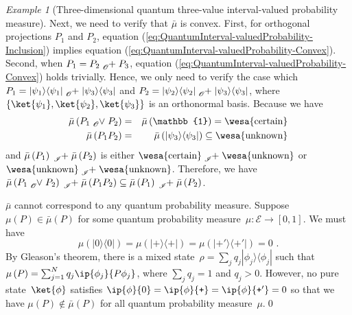 \documentclass{article}
\theoremstyle{remark}
\newtheorem{example}{Example}
\newcommand{\events}{\ensuremath{\mathcal{E}}}
\newcommand{\proj}[1]{|#1 \rangle\langle #1 |}
\newcommand{\ps}{\texttt{+}}
\newcommand{\necess}{{\mbox{\wesa{certain}}}}
\newcommand{\unknown}{{\mbox{\wesa{unknown}}}}
\begin{document}
\begin{example}[Three-dimensional quantum three-value interval-valued
probability measure]
Next, we need to verify that $\bar{\mu}$ is convex. First, for orthogonal
projections $P_{1}$ and $P_{2}$, equation (\ref{eq:QuantumInterval-valuedProbability-Inclusion})
implies equation (\ref{eq:QuantumInterval-valuedProbability-Convex}).
Second, when $P_{1}=P_{2}\tensor*[_{\mathscr{O}}]{+}{}P_{3}$, equation
(\ref{eq:QuantumInterval-valuedProbability-Convex}) holds trivially.
Hence, we only need to verify the case which $P_{1}=\proj{\psi_{1}}\tensor*[_{\mathscr{O}}]{+}{}\proj{\psi_{3}}$
and $P_{2}=\proj{\psi_{2}}\tensor*[_{\mathscr{O}}]{+}{}\proj{\psi_{3}}$,
where $\left\{ \ket{\psi_{1}},\ket{\psi_{2}},\ket{\psi_{3}}\right\} $
is an orthonormal basis. Because we have 
\begin{eqnarray*}
\bar{\mu}\left(P_{1}\tensor*[_{\mathscr{O}}]{\vee}{}P_{2}\right) & = & \bar{\mu}\left(\mathbb{1}\right)=\necess\\
\bar{\mu}\left(P_{1}P_{2}\right) & = & \bar{\mu}\left(\proj{\psi_{3}}\right)\subseteq\unknown
\end{eqnarray*}
and $\bar{\mu}\left(P_{1}\right)\tensor*[_{\mathscr{I}}]{+}{}\bar{\mu}\left(P_{2}\right)$
is either $\necess\tensor*[_{\mathscr{I}}]{+}{}\unknown$ or $\unknown\tensor*[_{\mathscr{I}}]{+}{}\unknown$.
Therefore, we have $\bar{\mu}\left(P_{1}\tensor*[_{\mathscr{O}}]{\vee}{}P_{2}\right)\tensor*[_{\mathscr{I}}]{+}{}\bar{\mu}\left(P_{1}P_{2}\right)\subseteq\bar{\mu}\left(P_{1}\right)\tensor*[_{\mathscr{I}}]{+}{}\bar{\mu}\left(P_{2}\right)$.

$\bar{\mu}$ cannot correspond to any quantum probability measure.
Suppose $\mu(P)\in\bar{\mu}(P)$ for some quantum probability measure~$\mu:\events\rightarrow\left[0,1\right]$.
We must have 
\begin{equation}
\mu(\proj{0})=\mu(\proj{\ps})=\mu(\proj{\ps'})=0\textrm{ .}\label{eq:probability-zero-on-states}
\end{equation}
By Gleason's theorem, there is a mixed state~$\rho=\sum_{j}q_{j}\proj{\phi_{j}}$
such that $\mu\left(P\right)=\sum_{j=1}^{N}q_{j}\ip{\phi_{j}}{P\phi_{j}}$,
where $\sum_{j}q_{j}=1$ and $q_{j}>0$. However, no pure state~$\ket{\phi}$
satisfies $\ip{\phi}{0}=\ip{\phi}{\ps}=\ip{\phi}{\ps'}=0$ so that
we have $\mu(P)\notin\bar{\mu}(P)$ for all quantum probability measure~$\mu$.\qed\end{example}

\end{document}
